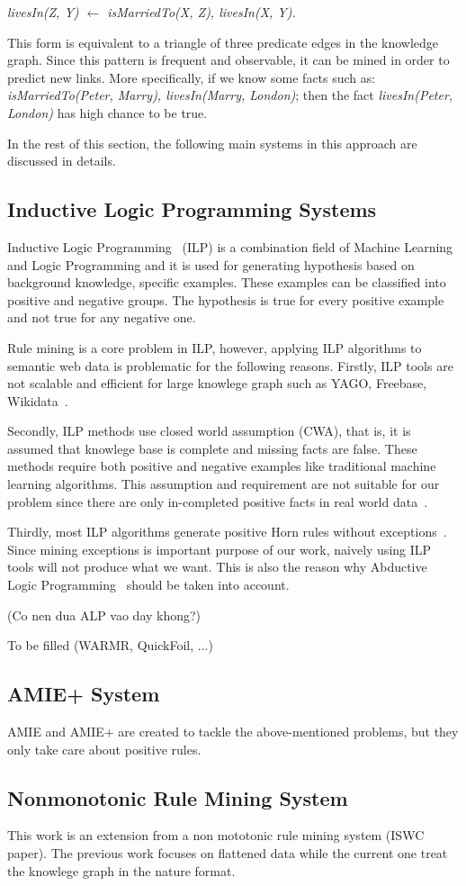 \centerline{\textit{livesIn(Z, Y) $\leftarrow$ isMarriedTo(X, Z), livesIn(X, Y).}}

This form is equivalent to a triangle of three predicate edges in the knowledge graph. Since this pattern is frequent and observable, it can be mined in order to predict new links. More specifically, if we know some facts such as: \textit{isMarriedTo(Peter, Marry), livesIn(Marry, London)}; then the fact \textit{livesIn(Peter, London)} has high chance to be true.

In the rest of this section, the following main systems in this approach are discussed in details.

\subsection{Inductive Logic Programming Systems}

Inductive Logic Programming~\cite{ref9} (ILP) is a combination field of Machine Learning and Logic Programming and it is used for generating hypothesis based on background knowledge, specific examples. These examples can be classified into positive and negative groups. The hypothesis is true for every positive example and not true for any negative one.

Rule mining is a core problem in ILP, however, applying ILP algorithms to semantic web data is problematic for the following reasons. Firstly, ILP tools are not scalable and efficient for large knowlege graph such as YAGO, Freebase, Wikidata~\cite{ref10}. 

Secondly, ILP methods use closed world assumption (CWA), that is, it is assumed that knowlege base is complete and missing facts are false. These methods require both positive and negative examples like traditional machine learning algorithms. This assumption and requirement are not suitable for our problem since there are only in-completed positive facts in real world data~\cite{ref10}.

Thirdly, most ILP algorithms generate positive Horn rules without exceptions~\cite{ref11}. Since mining exceptions is important purpose of our work, naively using ILP tools will not produce what we want. This is also the reason why Abductive Logic Programming~\cite{ref11} should be taken into account.

(Co nen dua ALP vao day khong?)

To be filled (WARMR, QuickFoil, ...)

\subsection{AMIE+ System}

AMIE and AMIE+ are created to tackle the above-mentioned problems, but they only take care about positive rules.

\subsection{Nonmonotonic Rule Mining System}

This work is an extension from a non mototonic rule mining system (ISWC paper). The previous work focuses on flattened data while the current one treat the knowlege graph in the nature format.
